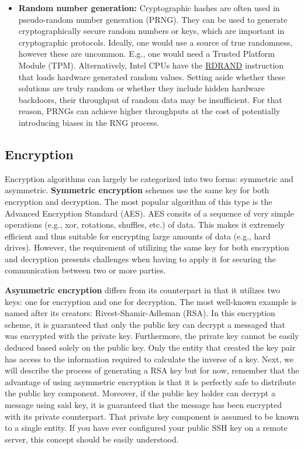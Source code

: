 \begin{itemize}
    \item \textbf{Random number generation:} Cryptographic hashes are often used
          in pseudo-random number generation (PRNG). They can be used to
          generate cryptographically secure random numbers or keys, which are
          important in cryptographic protocols. Ideally, one would use a source
          of true randomness, however these are uncommon. E.g., one would need
          a Trusted Platform Module (TPM). Alternatively, Intel CPUs have the
          \href{https://www.felixcloutier.com/x86/rdrand}{RDRAND} instruction
          that loads hardware generated random values. Setting aside whether
          these solutions are truly random or whether they include hidden
          hardware backdoors, their throughput of random data may be
          insufficient. For that reason, PRNGs can achieve higher throughputs
          at the cost of potentially introducing biases in the RNG process.
\end{itemize}


\subsection{Encryption}

Encryption algorithms can largely be categorized into two forms: symmetric and
asymmetric. \textbf{Symmetric encryption} schemes use the same key for both
encryption and decryption. The most popular algorithm of this type is the
Advanced Encryption Standard (AES). AES consits of a sequence of very simple
operations (e.g., xor, rotations, shuffles, etc.) of data. This makes it
extremely efficient and thus suitable for encrypting large amounts of data
(e.g., hard drives). However, the requirement of utilizing the same key for
both encryption and decryption presents challenges when having to apply it
for securing the communication between two or more parties.

\textbf{Asymmetric encryption} differs from its counterpart in that it utilizes
two keys: one for encryption and one for decryption. The most well-known example
is named after its creators: Rivest-Shamir-Adleman (RSA). In this encryption
scheme, it is guaranteed that only the public key can decrypt a messaged that
was encrypted with the private key. Furthermore, the private key cannot be
easily deduced based solely on the public key. Only the entity that created the
key pair has access to the information required to calculate the inverse of a
key. Next, we will describe the process of generating a RSA key but for now,
remember that the advantage of using asymmetric encryption is that it is
perfectly safe to distribute the public key component. Moreover, if the public
key holder can decrypt a message using said key, it is guaranteed that the
message has been encrypted with its private counterpart. That private key
component is assumed to be known to a single entity. If you have ever configured
your public SSH key on a remote server, this concept should be easily understood.

